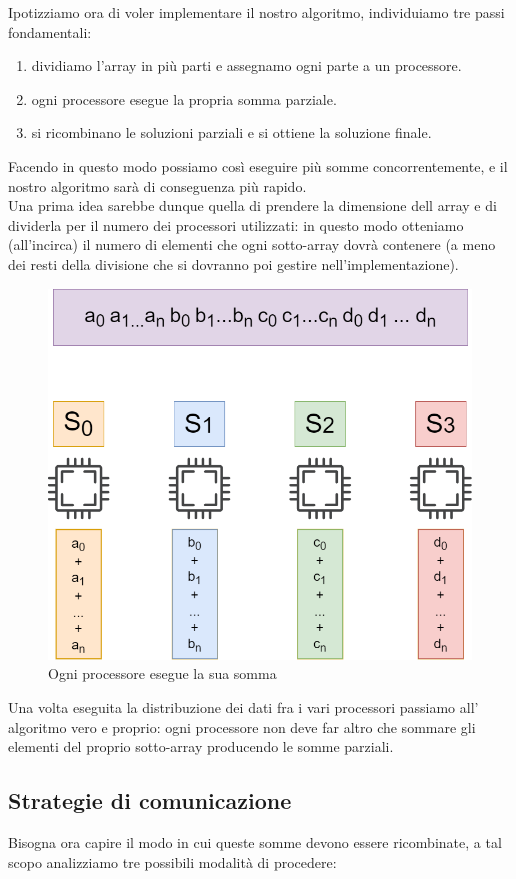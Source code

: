\documentclass{article}
\begin{document}
    Ipotizziamo ora di voler implementare il nostro algoritmo, individuiamo tre passi fondamentali:
    \begin{enumerate}
        \item dividiamo l'array in più parti e assegnamo ogni parte a un processore.
        \item ogni processore esegue la propria somma parziale.
        \item si ricombinano le soluzioni parziali e si ottiene la soluzione finale.
    \end{enumerate}

    Facendo in questo modo possiamo così eseguire più somme concorrentemente, e il nostro algoritmo sarà di conseguenza più rapido.\\
    Una prima idea sarebbe dunque quella di prendere la dimensione dell array e di dividerla per il numero dei processori utilizzati: in questo modo otteniamo (all'incirca) il numero di elementi che ogni sotto-array dovrà contenere (a meno dei resti della divisione che si dovranno poi gestire nell'implementazione).

    \begin{figure}[!htbp]
        \centering
        \includegraphics[width=0.6\linewidth]{somme_parziali.drawio (1).png}
        \caption{Ogni processore esegue la sua somma}
        \label{fig:enter-label}
    \end{figure}

    Una volta eseguita la distribuzione dei dati fra i vari processori passiamo all' algoritmo vero e proprio: ogni processore non deve far altro che sommare gli elementi del proprio sotto-array producendo le somme parziali.\\
    

\subsection{Strategie di comunicazione}
 Bisogna ora capire il modo in cui queste somme devono essere ricombinate, a tal scopo analizziamo tre possibili modalità di procedere:
\end{document}
